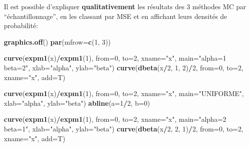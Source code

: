 \documentclass[]{article}
\newenvironment{Shaded}{\begin{snugshade}}{\end{snugshade}}
\newcommand{\DataTypeTok}[1]{\textcolor[rgb]{0.13,0.29,0.53}{#1}}
\newcommand{\DecValTok}[1]{\textcolor[rgb]{0.00,0.00,0.81}{#1}}
\newcommand{\KeywordTok}[1]{\textcolor[rgb]{0.13,0.29,0.53}{\textbf{#1}}}
\newcommand{\NormalTok}[1]{#1}
\newcommand{\OperatorTok}[1]{\textcolor[rgb]{0.81,0.36,0.00}{\textbf{#1}}}
\newcommand{\StringTok}[1]{\textcolor[rgb]{0.31,0.60,0.02}{#1}}
\begin{document}
Il est possible d'expliquer \textbf{qualitativement} les résultats des 3
méthodes MC par ``échantillonnage'', en les classant par MSE et en
affichant leurs densités de probabilité:

\begin{Shaded}
\begin{Highlighting}[]
\KeywordTok{graphics.off}\NormalTok{()}
\KeywordTok{par}\NormalTok{(}\DataTypeTok{mfrow=}\KeywordTok{c}\NormalTok{(}\DecValTok{1}\NormalTok{, }\DecValTok{3}\NormalTok{))}

\KeywordTok{curve}\NormalTok{(}\KeywordTok{expm1}\NormalTok{(x)}\OperatorTok{/}\KeywordTok{expm1}\NormalTok{(}\DecValTok{1}\NormalTok{), }\DataTypeTok{from=}\DecValTok{0}\NormalTok{, }\DataTypeTok{to=}\DecValTok{2}\NormalTok{, }\DataTypeTok{xname=}\StringTok{"x"}\NormalTok{, }
          \DataTypeTok{main=}\StringTok{"alpha=1 beta=2"}\NormalTok{,}
          \DataTypeTok{xlab=}\StringTok{"alpha"}\NormalTok{, }\DataTypeTok{ylab=}\StringTok{"beta"}\NormalTok{)}
\KeywordTok{curve}\NormalTok{(}\KeywordTok{dbeta}\NormalTok{(x}\OperatorTok{/}\DecValTok{2}\NormalTok{, }\DecValTok{1}\NormalTok{, }\DecValTok{2}\NormalTok{)}\OperatorTok{/}\DecValTok{2}\NormalTok{, }\DataTypeTok{from=}\DecValTok{0}\NormalTok{, }\DataTypeTok{to=}\DecValTok{2}\NormalTok{, }\DataTypeTok{xname=}\StringTok{"x"}\NormalTok{, }\DataTypeTok{add=}\NormalTok{T)}

\KeywordTok{curve}\NormalTok{(}\KeywordTok{expm1}\NormalTok{(x)}\OperatorTok{/}\KeywordTok{expm1}\NormalTok{(}\DecValTok{1}\NormalTok{), }\DataTypeTok{from=}\DecValTok{0}\NormalTok{, }\DataTypeTok{to=}\DecValTok{2}\NormalTok{, }\DataTypeTok{xname=}\StringTok{"x"}\NormalTok{, }
          \DataTypeTok{main=}\StringTok{"UNIFORME"}\NormalTok{,}
          \DataTypeTok{xlab=}\StringTok{"alpha"}\NormalTok{, }\DataTypeTok{ylab=}\StringTok{"beta"}\NormalTok{)}
\KeywordTok{abline}\NormalTok{(}\DataTypeTok{a=}\DecValTok{1}\OperatorTok{/}\DecValTok{2}\NormalTok{, }\DataTypeTok{b=}\DecValTok{0}\NormalTok{)}

\KeywordTok{curve}\NormalTok{(}\KeywordTok{expm1}\NormalTok{(x)}\OperatorTok{/}\KeywordTok{expm1}\NormalTok{(}\DecValTok{1}\NormalTok{), }\DataTypeTok{from=}\DecValTok{0}\NormalTok{, }\DataTypeTok{to=}\DecValTok{2}\NormalTok{, }\DataTypeTok{xname=}\StringTok{"x"}\NormalTok{, }
          \DataTypeTok{main=}\StringTok{"alpha=2 beta=1"}\NormalTok{,}
          \DataTypeTok{xlab=}\StringTok{"alpha"}\NormalTok{, }\DataTypeTok{ylab=}\StringTok{"beta"}\NormalTok{)}
\KeywordTok{curve}\NormalTok{(}\KeywordTok{dbeta}\NormalTok{(x}\OperatorTok{/}\DecValTok{2}\NormalTok{, }\DecValTok{2}\NormalTok{, }\DecValTok{1}\NormalTok{)}\OperatorTok{/}\DecValTok{2}\NormalTok{, }\DataTypeTok{from=}\DecValTok{0}\NormalTok{, }\DataTypeTok{to=}\DecValTok{2}\NormalTok{, }\DataTypeTok{xname=}\StringTok{"x"}\NormalTok{, }\DataTypeTok{add=}\NormalTok{T)}
\end{Highlighting}
\end{Shaded}
\end{document}
